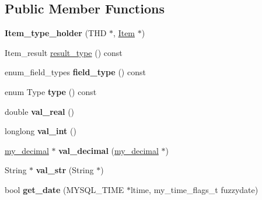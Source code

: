 \subsection*{Public Member Functions}
\begin{DoxyCompactItemize}
\item 
\mbox{\label{classItem__type__holder_ae3023d5913d482a067f714f0ec46db1a}} 
{\bfseries Item\+\_\+type\+\_\+holder} (T\+HD $\ast$, \mbox{\hyperlink{classItem}{Item}} $\ast$)
\item 
Item\+\_\+result \mbox{\hyperlink{classItem__type__holder_a5f84662e32ecbc99e401efbda856f791}{result\+\_\+type}} () const
\item 
\mbox{\label{classItem__type__holder_a565a902301c8942998965e4c64be7212}} 
enum\+\_\+field\+\_\+types {\bfseries field\+\_\+type} () const
\item 
\mbox{\label{classItem__type__holder_a16233d882805fd0fe2496596f59215c3}} 
enum Type {\bfseries type} () const
\item 
\mbox{\label{classItem__type__holder_a1eee3a7d40920ac1e44901bb7b62e87d}} 
double {\bfseries val\+\_\+real} ()
\item 
\mbox{\label{classItem__type__holder_a61b8b8ff0efb98cefe0680d91d7e90da}} 
longlong {\bfseries val\+\_\+int} ()
\item 
\mbox{\label{classItem__type__holder_ac11e9fb174ff2d2ac2f531e60f643513}} 
\mbox{\hyperlink{classmy__decimal}{my\+\_\+decimal}} $\ast$ {\bfseries val\+\_\+decimal} (\mbox{\hyperlink{classmy__decimal}{my\+\_\+decimal}} $\ast$)
\item 
\mbox{\label{classItem__type__holder_a90e8678260ed88bf4ce7ed3521a613df}} 
String $\ast$ {\bfseries val\+\_\+str} (String $\ast$)
\item 
\mbox{\label{classItem__type__holder_a1c3665f0c1d3cde06729190da07ed0f7}} 
bool {\bfseries get\+\_\+date} (M\+Y\+S\+Q\+L\+\_\+\+T\+I\+ME $\ast$ltime, my\+\_\+time\+\_\+flags\+\_\+t fuzzydate)
\item 

\end{DoxyCompactItemize}
